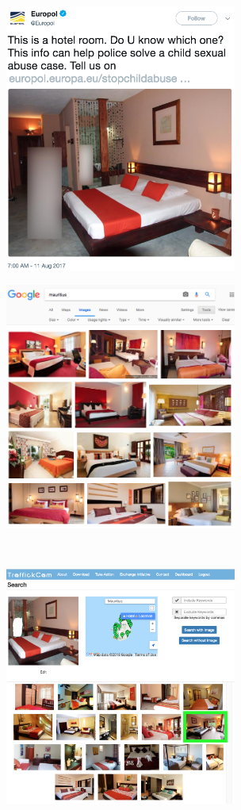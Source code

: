 \documentclass[12pt]{article}
\begin{document}
\begin{figure}
    \centering
    \begin{subfigure}[b]{3.1in}
        \includegraphics[width=3in]{figs/europol/twitter}
        \caption{}
        \label{fig:europolTwitter}
    \end{subfigure}
    \unskip \hspace{0pt}
    \begin{subfigure}[b]{3.1in}
        \includegraphics[width=3in]{figs/europol/google}
        \caption{}
        \label{fig:europolGoogle}
    \end{subfigure}\\
    \begin{subfigure}[b]{3.1in}
        \includegraphics[width=3in]{figs/europol/tCam}

\end{subfigure}
\end{figure}
\end{document}
